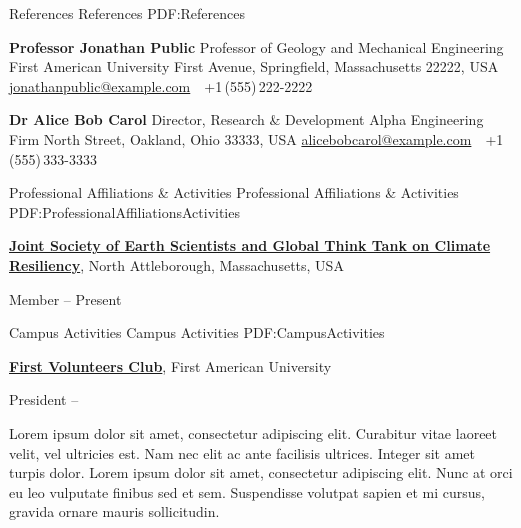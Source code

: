 \documentclass[letterpaper,MMMyyyy,nonstopmode]{simpleresumecv}
\begin{document}
\begin{Body}
{\Section
{References}
{References}
{PDF:References}

\BulletItem
\textbf{Professor Jonathan Public}
\newline
Professor of Geology and Mechanical Engineering
\newline
First American University
 First Avenue, Springfield, Massachusetts 22222, USA
\newline
\href{mailto:jonathanpublic@example.com}
{jonathanpublic@example.com}
\,\SubBulletSymbol\,
+1\,(555)\,222-2222

\BigGap
\BulletItem
\textbf{Dr Alice Bob Carol}
\newline
Director, Research \& Development
\newline
Alpha Engineering Firm
 North Street, Oakland, Ohio 33333, USA
\newline
\href{mailto:alicebobcarol@example.com}
{alicebobcarol@example.com}
\,\SubBulletSymbol\,
+1\,(555)\,333-3333





\Section
{Professional Affiliations\newline
\& Activities}
{Professional Affiliations \& Activities}
{PDF:ProfessionalAffiliationsActivities}

\Entry
\href{http://www.example.com/my-society}
{\textbf{Joint Society of Earth Scientists and Global Think Tank on Climate Resiliency}},
\newline
North Attleborough, Massachusetts, USA

\Gap
\BulletItem
Member
\hfill
{} --
Present

\newpage


\Section
{Campus Activities}
{Campus Activities}
{PDF:CampusActivities}

\Entry
\href{http://www.example.com/my-club}
{\textbf{First Volunteers Club}},
First American University

\Gap
\BulletItem
President
\hfill
{} --
\begin{Detail}
\SubBulletItem
Lorem ipsum dolor sit amet, consectetur adipiscing elit.
\SubBulletItem
Curabitur vitae laoreet velit, vel ultricies est. Nam nec elit ac ante facilisis ultrices.
\SubBulletItem
Integer sit amet turpis dolor. Lorem ipsum dolor sit amet, consectetur adipiscing elit. Nunc at orci eu leo vulputate finibus sed et sem.
\SubBulletItem
Suspendisse volutpat sapien et mi cursus, gravida ornare mauris sollicitudin.
\end{Detail}

}
\end{Body}
\end{document}
